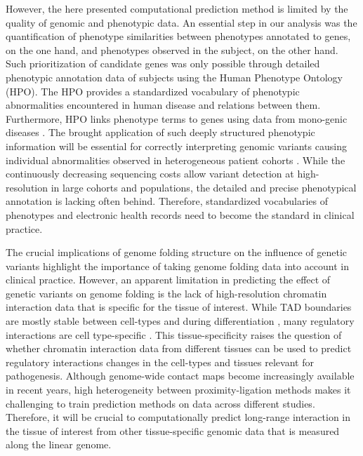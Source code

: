 \documentclass[a4paper,twoside=true,openright,parskip=full,chapterprefix=true,11pt,headings=normal,bibliography=totoc,listof=totoc,titlepage=on,captions=tableabove,draft=false]{scrreprt}
\theoremstyle{definition}
\theoremstyle{definition}
\theoremstyle{definition}
\theoremstyle{remark}
\begin{document}
However, the here presented computational prediction method is limited
by the quality of genomic and phenotypic data. An essential step in our
analysis was the quantification of phenotype similarities between
phenotypes annotated to genes, on the one hand, and phenotypes observed
in the subject, on the other hand. Such prioritization of candidate
genes was only possible through detailed phenotypic annotation data of
subjects using the Human Phenotype Ontology (HPO). The HPO provides a
standardized vocabulary of phenotypic abnormalities encountered in human
disease and relations between them. Furthermore, HPO links phenotype
terms to genes using data from mono-genic diseases \citep{Kohler2014}.
The brought application of such deeply structured phenotypic information
will be essential for correctly interpreting genomic variants causing
individual abnormalities observed in heterogeneous patient cohorts
\citep{Brookes2015}. While the continuously decreasing sequencing costs
allow variant detection at high-resolution in large cohorts and
populations, the detailed and precise phenotypical annotation is lacking
often behind. Therefore, standardized vocabularies of phenotypes and
electronic health records need to become the standard in clinical
practice.

The crucial implications of genome folding structure on the influence of
genetic variants highlight the importance of taking genome folding data
into account in clinical practice. However, an apparent limitation in
predicting the effect of genetic variants on genome folding is the lack
of high-resolution chromatin interaction data that is specific for the
tissue of interest. While TAD boundaries are mostly stable between
cell-types \citep{Dixon2012, Rao2014, Schmitt2016} and during
differentiation \citep{Dixon2015}, many regulatory interactions are cell
type-specific \citep{LeDily2014, Dixon2015}. This tissue-specificity
raises the question of whether chromatin interaction data from different
tissues can be used to predict regulatory interactions changes in the
cell-types and tissues relevant for pathogenesis. Although genome-wide
contact maps become increasingly available in recent years, high
heterogeneity between proximity-ligation methods makes it challenging to
train prediction methods on data across different studies. Therefore, it
will be crucial to computationally predict long-range interaction in the
tissue of interest from other tissue-specific genomic data that is
measured along the linear genome.
\end{document}
